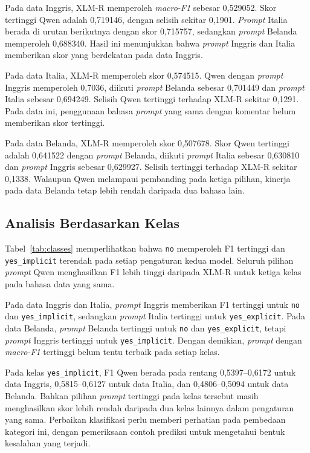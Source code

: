 \documentclass[11pt]{article}
\begin{document}
Pada data Inggris, XLM-R memperoleh \textit{macro-F1} sebesar 0,529052. Skor tertinggi Qwen adalah 0,719146, dengan selisih sekitar 0,1901. \textit{Prompt} Italia berada di urutan berikutnya dengan skor 0,715757, sedangkan \textit{prompt} Belanda memperoleh 0,688340. Hasil ini menunjukkan bahwa \textit{prompt} Inggris dan Italia memberikan skor yang berdekatan pada data Inggris.

Pada data Italia, XLM-R memperoleh skor 0,574515. Qwen dengan \textit{prompt} Inggris memperoleh 0,7036, diikuti \textit{prompt} Belanda sebesar 0,701449 dan \textit{prompt} Italia sebesar 0,694249. Selisih Qwen tertinggi terhadap XLM-R sekitar 0,1291. Pada data ini, penggunaan bahasa \textit{prompt} yang sama dengan komentar belum memberikan skor tertinggi.

Pada data Belanda, XLM-R memperoleh skor 0,507678. Skor Qwen tertinggi adalah 0,641522 dengan \textit{prompt} Belanda, diikuti \textit{prompt} Italia sebesar 0,630810 dan \textit{prompt} Inggris sebesar 0,629927. Selisih tertinggi terhadap XLM-R sekitar 0,1338. Walaupun Qwen melampaui pembanding pada ketiga pilihan, kinerja pada data Belanda tetap lebih rendah daripada dua bahasa lain.

\subsection{Analisis Berdasarkan Kelas}
Tabel~\ref{tab:classes} memperlihatkan bahwa \texttt{no} memperoleh F1 tertinggi dan \texttt{yes\_implicit} terendah pada setiap pengaturan kedua model. Seluruh pilihan \textit{prompt} Qwen menghasilkan F1 lebih tinggi daripada XLM-R untuk ketiga kelas pada bahasa data yang sama.



Pada data Inggris dan Italia, \textit{prompt} Inggris memberikan F1 tertinggi untuk \texttt{no} dan \nolinkurl{yes_implicit}, sedangkan \textit{prompt} Italia tertinggi untuk \nolinkurl{yes_explicit}. Pada data Belanda, \textit{prompt} Belanda tertinggi untuk \texttt{no} dan \nolinkurl{yes_explicit}, tetapi \textit{prompt} Inggris tertinggi untuk \nolinkurl{yes_implicit}. Dengan demikian, \textit{prompt} dengan \textit{macro-F1} tertinggi belum tentu terbaik pada setiap kelas.

Pada kelas \texttt{yes\_implicit}, F1 Qwen berada pada rentang 0,5397--0,6172 untuk data Inggris, 0,5815--0,6127 untuk data Italia, dan 0,4806--0,5094 untuk data Belanda. Bahkan pilihan \textit{prompt} tertinggi pada kelas tersebut masih menghasilkan skor lebih rendah daripada dua kelas lainnya dalam pengaturan yang sama. Perbaikan klasifikasi perlu memberi perhatian pada pembedaan kategori ini, dengan pemeriksaan contoh prediksi untuk mengetahui bentuk kesalahan yang terjadi.
\end{document}

